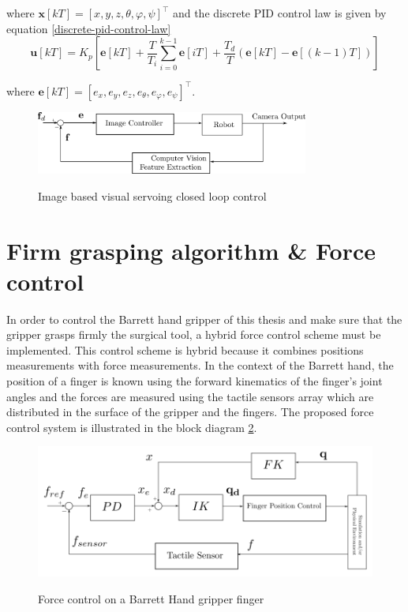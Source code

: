 where $\mathbf{x}[kT] = [x, y, z, θ, φ, ψ]^\top$ and the discrete PID control law is given by equation \ref{discrete-pid-control-law}
\begin{equation}
\label{discrete-pid-control-law}
\mathbf{u}[kT] = K_p \left[ \mathbf{e}[kT] + \frac{T}{T_i} \sum_{i=0}^{k-1} \mathbf{e}[iT] + \frac{T_d}{T} \left( \mathbf{e}[kT] - \mathbf{e}[(k-1)T] \right) \right]
\end{equation}

where $\mathbf{e}[kT] = [e_x, e_y, e_z, e_θ, e_φ, e_ψ]^\top$.

\begin{center}
\begin{figure}[!htb]
\centering
\includegraphics[width=0.8\textwidth]{images/visual-servoing-image-based.png}\\
\caption{Image based visual servoing closed loop control}
\label{visual-servoing-image-based-control}
\end{figure}
\end{center}


\section{Firm grasping algorithm \& Force control}

In order to control the Barrett hand gripper of this thesis and make sure that the gripper grasps firmly the surgical tool, a hybrid force control scheme must be implemented. This control scheme is hybrid because it 
combines positions measurements with force measurements. In the context of the Barrett hand, the position of a finger is known using the forward kinematics of the finger's joint angles and the forces are measured using 
the tactile sensors array which are distributed in the surface of the gripper and the fingers. The proposed force control system is illustrated in the block diagram \ref{finger-force-control}.\\

\begin{center}
\begin{figure}[!htb]
\centering
\includegraphics[width=12cm]{images/finger-force-control.png}\\
\caption{Force control on a Barrett Hand gripper finger}
\label{finger-force-control}
\end{figure}
\end{center}

